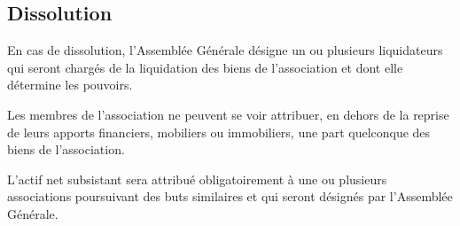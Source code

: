 \documentclass[a4paper,french,10pt]{article}
\begin{document}
\subsection{Dissolution}
\label{sec:dissolution}
En cas de dissolution, l’Assemblée Générale désigne un ou plusieurs
liquidateurs qui seront chargés de la liquidation des biens de
l’association et dont elle détermine les pouvoirs.

Les membres de l’association ne peuvent se voir attribuer, en dehors
de la reprise de leurs apports financiers, mobiliers ou immobiliers,
une part quelconque des biens de l’association.

L’actif net subsistant sera attribué obligatoirement à une ou
plusieurs associations poursuivant des buts similaires et qui seront
désignés par l’Assemblée Générale.
\end{document}
